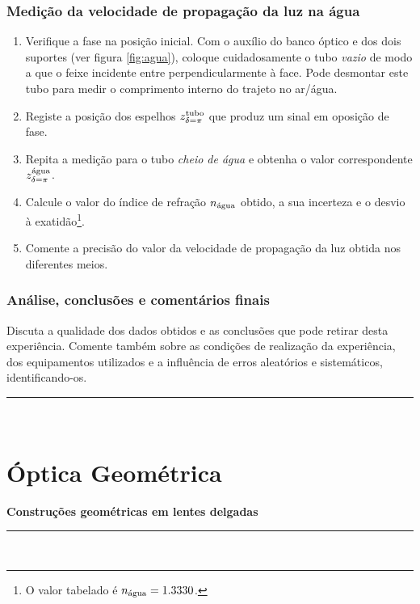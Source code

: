 \documentclass[a4paper,twoside,11pt]{report}      %
\newcommand{\HRule}{\rule{\linewidth}{0.5mm}}
\begin{document}
\subsection{\sf Medição da velocidade de propagação da luz na água}
\begin{enumerate}
\item Verifique a fase na posição inicial. Com o auxílio do banco óptico e dos dois suportes (ver figura \ref{fig:agua}), coloque cuidadosamente o tubo \emph{vazio} de modo a que o feixe incidente entre perpendicularmente à face. Pode desmontar este tubo para medir o comprimento interno do trajeto no ar/água.
\item Registe a posição dos espelhos $z_{\delta=\pi}^{\textup{tubo}}$ que produz um sinal em oposição de fase. 
\item Repita a medição para o tubo \emph{cheio de água} e obtenha o valor correspondente $z_{\delta=\pi}^{\textup{água}}$. 
\item Calcule o valor do índice de refração $n_{\textup{água}}$ obtido, a sua incerteza e o desvio à exatidão\footnote{O valor tabelado é $n_{\textup{água}}=1.3330$.}. 
\item Comente a precisão do valor da velocidade de propagação da luz obtida nos 
diferentes meios.
\end{enumerate}

\subsection{\sf Análise, conclusões e comentários finais}
Discuta a qualidade dos dados obtidos e as conclusões que pode retirar desta experiência. Comente também sobre as condições de realização da experiência, dos equipamentos utilizados e a influência de erros aleatórios e sistemáticos, identificando-os.\\
	\HRule \\[0.5cm]


\chapter{\huge{Óptica Geométrica}}
\large {\bf {Construções geométricas em lentes delgadas}}\\
	\HRule \\%
\end{document}
